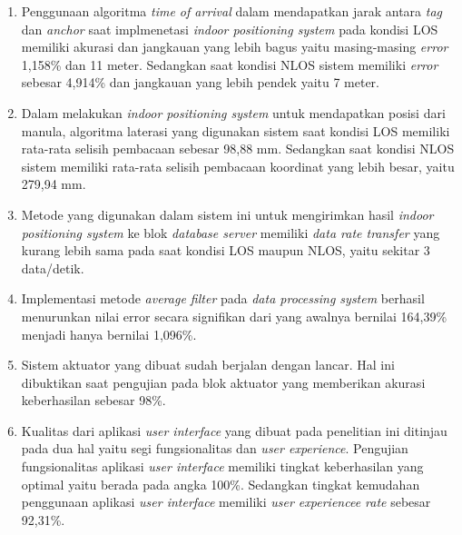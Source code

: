 \begin{enumerate} [nolistsep]
	\item Penggunaan algoritma \textit{time of arrival} dalam mendapatkan jarak antara \textit{tag} dan \textit{anchor} saat implmenetasi \textit{indoor positioning system} pada kondisi LOS memiliki akurasi dan jangkauan yang lebih bagus yaitu masing-masing \textit{error} 1,158\% dan 11 meter. Sedangkan saat kondisi NLOS sistem memiliki \textit{error} sebesar 4,914\% dan jangkauan yang lebih pendek yaitu 7 meter. 
	
	\item Dalam melakukan \textit{indoor positioning system} untuk mendapatkan posisi dari manula, algoritma laterasi yang digunakan sistem saat kondisi LOS memiliki rata-rata selisih pembacaan sebesar 98,88 mm. Sedangkan saat kondisi NLOS sistem memiliki rata-rata selisih pembacaan koordinat yang lebih besar, yaitu 279,94 mm.
	
	\item Metode yang digunakan dalam sistem ini untuk mengirimkan hasil \textit{indoor positioning system} ke blok \textit{database server} memiliki \textit{data rate transfer} yang kurang lebih sama pada saat kondisi LOS maupun NLOS, yaitu sekitar 3 data/detik. 
	
	\item Implementasi metode \textit{average filter} pada \textit{data processing system} berhasil menurunkan nilai error secara signifikan dari yang awalnya bernilai 164,39\% menjadi hanya bernilai 1,096\%.
	
	\item Sistem aktuator yang dibuat sudah berjalan dengan lancar. Hal ini dibuktikan saat pengujian pada blok aktuator yang memberikan akurasi keberhasilan sebesar 98\%.
	
	\item Kualitas dari aplikasi \textit{user interface} yang dibuat pada penelitian ini ditinjau pada dua hal yaitu segi fungsionalitas dan \textit{user experience}. Pengujian fungsionalitas aplikasi \textit{user interface} memiliki tingkat keberhasilan yang optimal yaitu berada pada angka 100\%. Sedangkan tingkat kemudahan penggunaan aplikasi \textit{user interface} memiliki \textit{user experiencee rate} sebesar 92,31\%.
\end{enumerate}
\vspace{1ex}

